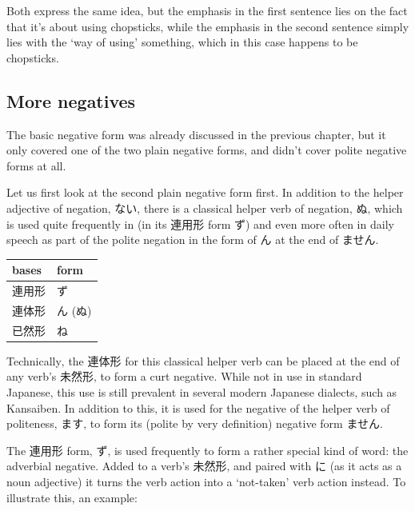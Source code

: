 \documentclass[11pt, b5paper, twoside, openright, onecolumn]{book}
\newenvironment{mytabular}[1]{\noindent\hspace{0.4in}
\begin{tabular}[h]{#1}}{\end{tabular}}
\begin{document}
Both express the same idea‚ but the emphasis in the first sentence lies on the fact that it’s about using chopsticks‚ while the emphasis in the second sentence simply lies with the ‘way of using’ something‚ which in this case happens to be chopsticks.

\subsection{More negatives}

The basic negative form was already discussed in the previous chapter‚ but it only covered one of the two plain negative forms‚ and didn’t cover polite negative forms at all.

Let us first look at the second plain negative form first. In addition to the helper adjective of negation‚ ない‚ there is a classical helper verb of negation‚ ぬ‚ which is used quite frequently in  (in its 連用形 form ず) and even more often in daily speech as part of the polite negation in the form of ん at the end of ません.

\vspace{0.5cm}
\smaller
\begin{mytabular}{| l  l |}\hline 
\rule{0pt}{2.4ex}bases & form\\ 
\hline
\rule{0pt}{2.4ex}連用形 & \index[japanese]{ず}ず\\ 
\rule{0pt}{2.4ex}連体形 & \index[japanese]{ん}ん (\index[japanese]{ぬ}ぬ)\\ 
\rule{0pt}{2.4ex}已然形 & ね\\ 
\hline 
\end{mytabular}
\larger
\vspace{0.5cm}


Technically‚ the 連体形 for this classical helper verb can be placed at the end of any verb’s 未然形‚ to form a curt negative. While not in use in standard Japanese‚ this use is still prevalent in several modern Japanese dialects‚ such as Kansaiben. In addition to this‚ it is used for the negative of the helper verb of politeness‚ ます‚ to form its (polite by very definition) negative form ません.

The 連用形 form‚ ず‚ is used frequently to form a rather special kind of word: the adverbial negative. Added to a verb’s 未然形‚ and paired with に (as it acts as a noun adjective) it turns the verb action into a ‘not-taken’ verb action instead. To illustrate this‚ an example:
\end{document}

